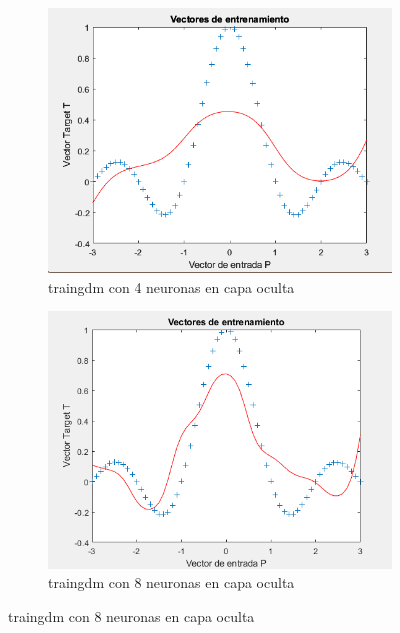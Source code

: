 \documentclass[a4paper, 12pt]{article}
\begin{document}
                \begin{figure}[htp!]
                    \caption{Descenso gradiente con momento}
                    \begin{subfigure}{0.49\textwidth}
                        \centering
        		      \includegraphics[width=\textwidth]{figures/parte1/Ej2/Ej2_fig2_traingdm.png}
                        \caption{traingdm con 4 neuronas en capa oculta}
                    \end{subfigure}
                    \begin{subfigure}{0.49\textwidth}
                        \includegraphics[width=\textwidth]{figures/parte1/Ej2/Ej2_fig6_traingdm_8neuronas.png}
                        \caption{traingdm con 8 neuronas en capa oculta}
                    \end{subfigure}
                \end{figure}
\end{document}
